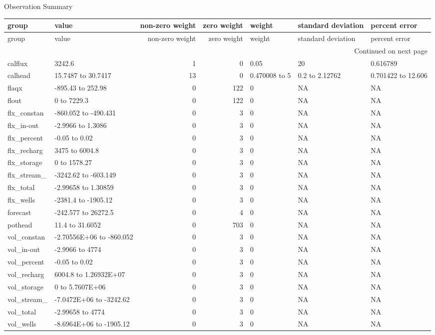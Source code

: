\documentclass{article}
\begin{document}
\begin{center}
Observation Summary
\end{center}
\begin{center}
\begin{landscape}
\setlength{\LTleft}{-4.0cm}
\begin{longtable}{llrrlll}
group & value & non-zero weight & zero weight & weight & standard deviation & percent error \\
\endfirsthead
group & value & non-zero weight & zero weight & weight & standard deviation & percent error \\
\endhead
\multicolumn{7}{r}{Continued on next page} \\
\endfoot
\endlastfoot
calflux & 3242.6 & 1 & 0 &  0.05 &    20 & 0.616789 \\
calhead & 15.7487 to 30.7417 & 13 & 0 & 0.470008 to     5 &   0.2 to 2.12762 & 0.701422 to 12.606 \\
flaqx & -895.43 to 252.98 & 0 & 122 &     0 & NA & NA \\
flout &     0 to 7229.3 & 0 & 122 &     0 & NA & NA \\
flx_constan & -860.052 to -490.431 & 0 & 3 &     0 & NA & NA \\
flx_in-out & -2.9966 to 1.3086 & 0 & 3 &     0 & NA & NA \\
flx_percent & -0.05 to  0.02 & 0 & 3 &     0 & NA & NA \\
flx_recharg &  3475 to 6004.8 & 0 & 3 &     0 & NA & NA \\
flx_storage &     0 to 1578.27 & 0 & 3 &     0 & NA & NA \\
flx_stream_ & -3242.62 to -603.149 & 0 & 3 &     0 & NA & NA \\
flx_total & -2.99658 to 1.30859 & 0 & 3 &     0 & NA & NA \\
flx_wells & -2381.4 to -1905.12 & 0 & 3 &     0 & NA & NA \\
forecast & -242.577 to 26272.5 & 0 & 4 &     0 & NA & NA \\
pothead &  11.4 to 31.6052 & 0 & 703 &     0 & NA & NA \\
vol_constan & -2.70556E+06 to -860.052 & 0 & 3 &     0 & NA & NA \\
vol_in-out & -2.9966 to  4774 & 0 & 3 &     0 & NA & NA \\
vol_percent & -0.05 to  0.02 & 0 & 3 &     0 & NA & NA \\
vol_recharg & 6004.8 to 1.26932E+07 & 0 & 3 &     0 & NA & NA \\
vol_storage &     0 to 5.7607E+06 & 0 & 3 &     0 & NA & NA \\
vol_stream_ & -7.0472E+06 to -3242.62 & 0 & 3 &     0 & NA & NA \\
vol_total & -2.99658 to  4774 & 0 & 3 &     0 & NA & NA \\
vol_wells & -8.6964E+06 to -1905.12 & 0 & 3 &     0 & NA & NA \\
\end{longtable}
\end{landscape}
\end{center}
\end{document}

